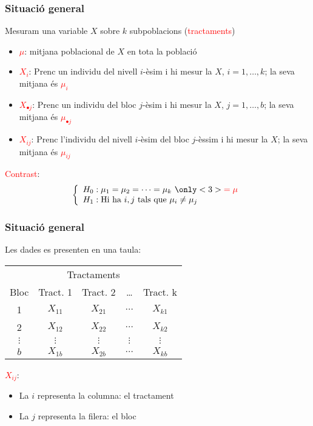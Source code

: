 \documentclass[12pt,t]{beamer}
\newcommand{\red}[1]{\textcolor{red}{#1}}
\theoremstyle{plain}
\theoremstyle{definition}
\begin{document}
\begin{frame}
\frametitle{Situació general}

Mesuram una variable $X$ sobre $k$ subpoblacions (\red{tractaments})\smallskip

\begin{itemize}
\item \red{$\mu$}: mitjana poblacional  de $X$ en tota la població
\smallskip

\item \red{$X_i$}: Prenc un individu del nivell $i$-èsim i hi mesur la $X$, $i=1,\ldots,k$; la seva mitjana és 
\red{$\mu_i$}\smallskip

\item \red{$X_{\bullet j}$}: Prenc un individu del bloc $j$-èsim i hi mesur la $X$, $j=1,\ldots,b$; la seva mitjana és  \red{$\mu_{\bullet j}$}
\smallskip

\item \red{$X_{ij}$}: Prenc l'individu del nivell $i$-èsim del bloc $j$-èssim i hi mesur la $X$; la seva mitjana és 
 \red{$\mu_{ij}$}
\end{itemize}\pause

\red{Contrast}:
$$
\left\{
\begin{array}{l}
H_0 : \mu_1=\mu_{2}=\cdots=\mu_{k}\ \only<3>{\red{ =\mu}} \\
H_1 : \mbox{Hi ha  }i,j\mbox{ tals que }  \mu_i \not=\mu_j
\end{array}
\right.
$$
\end{frame}


\begin{frame}
\frametitle{Situació general}

Les dades es presenten en una taula:
\begin{center}
\begin{tabular}{c|cccc}
\multicolumn{5}{c}{\hphantom{Blocs} Tractaments}
\\  Bloc & Tract.  1 &Tract.
 2 & \ldots &Tract.  k \\\hline
 1 &$X_{11}$&$X_{21}$&$\ldots$&$X_{k1}$\\
2&$X_{12}$&$X_{22}$&$\ldots$&$X_{k2}$\\
$\vdots$&$\vdots$&$\vdots$&$\vdots$&$\vdots$\\
$b$&$X_{1b}$&$X_{2b}$&$\ldots$&$X_{kb}$\\\hline
\end{tabular}
\end{center}
\medskip

\red{$X_{ij}$}: 
\begin{itemize}
\item La $i$ representa la columna: el tractament
\item La $j$ representa la filera: el bloc
\end{itemize}
\end{frame}
\end{document}
